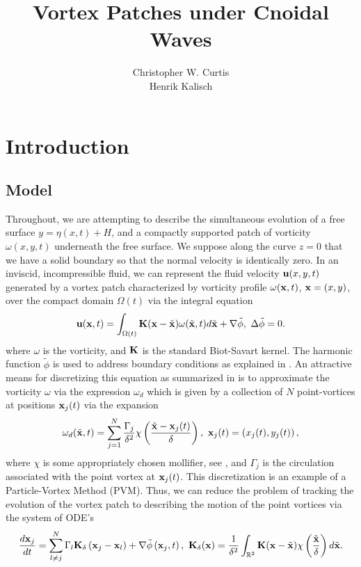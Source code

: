 \documentclass[a4paper,11pt]{article}
\title{Vortex Patches under Cnoidal Waves}
\author{Christopher W. Curtis\\
Henrik Kalisch}
\date{}
\begin{document}
\maketitle
\section*{Introduction}
\subsection*{Model}
Throughout, we are attempting to describe the simultaneous evolution of a free surface $y = \eta(x,t) + H$, and a compactly supported patch of vorticity $\omega(x,y,t)$ underneath the free surface.  We suppose along the curve $z=0$ that we have a solid boundary so that the normal velocity is identically zero.  In an inviscid, incompressible fluid, we can represent the fluid velocity ${\bf u}(x,y,t)$ generated by a vortex patch characterized by vorticity profile $\omega({\bf x},t)$, ${\bf x}=(x,y)$, over the compact domain $\Omega(t)$ via the integral equation
\[
{\bf u}({\bf x},t) = \int_{\Omega(t)} {\bf K}({\bf x}-\tilde{{\bf x}})\omega(\tilde{{\bf x}},t)d\tilde{{\bf x}} + \nabla \tilde{\phi}, ~ \Delta \tilde{\phi} = 0.
\]
where $\omega$ is the vorticity, and ${\bf K}$ is the standard Biot-Savart kernel.  The harmonic function $\tilde{\phi}$ is used to address boundary conditions as explained in \cite{saffman}.  An attractive means for discretizing this equation as summarized in \cite{cottet} is to approximate the vorticity $\omega$ via the expression $\omega_{d}$ which is given by a collection of $N$ point-vortices at positions ${\bf x}_{j}(t)$ via the expansion
\begin{equation}
\omega_{d}(\tilde{{\bf x}},t) = \sum_{j=1}^{N} \frac{\Gamma_{j}}{\delta^{2}}\chi\left(\frac{\tilde{{\bf x}}-{\bf x}_{j}(t)}{\delta}\right), ~ {\bf x}_{j}(t) = \left(x_{j}(t),y_{j}(t) \right),
\label{discvort} 
\end{equation}
where $\chi$ is some appropriately chosen mollifier, see \cite{beale}, and $\Gamma_{j}$ is the circulation associated with the point vortex at ${\bf x}_{j}(t)$.  This discretization is an example of a Particle-Vortex Method (PVM).  Thus, we can reduce the problem of tracking the evolution of the vortex patch to describing the motion of the point vortices via the system of ODE's
\[
\frac{d{\bf x}_{j}}{dt}  =  \sum_{l\neq j}^{N} \Gamma_{l} {\bf K}_{\delta}\left({\bf x}_{j}-{\bf x}_{l}\right) + \nabla \tilde{\phi}\left({\bf x}_{j},t\right), ~ {\bf K}_{\delta}({\bf x}) = \frac{1}{\delta^{2}}\int_{\mathbb{R}^{2}}{\bf K}({\bf x} - \tilde{\bf x})\chi \left(\frac{\tilde{{\bf x}}}{\delta} \right) d \tilde{{\bf x}}.
\]
\end{document}
